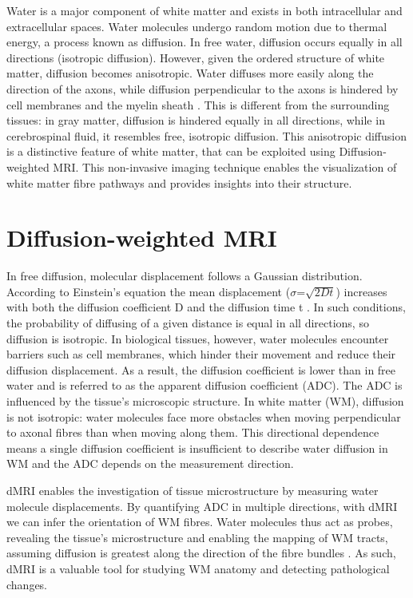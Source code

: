 Water is a major component of white matter and exists in both intracellular and extracellular spaces. Water molecules undergo random motion due to thermal energy, a process known as diffusion. In free water, diffusion occurs equally in all directions (isotropic diffusion). However, given the ordered structure of white matter, diffusion becomes anisotropic. Water diffuses more easily along the direction of the axons, while diffusion perpendicular to the axons is hindered by cell membranes and the myelin sheath \cite{Beaulieu2013}. This is different from the surrounding tissues: in gray matter, diffusion is hindered equally in all directions, while in cerebrospinal fluid, it resembles free, isotropic diffusion.
This anisotropic diffusion is a distinctive feature of white matter, that can be exploited using Diffusion-weighted MRI. This non-invasive imaging technique enables the visualization of white matter fibre pathways and provides insights into their structure.

\section{Diffusion-weighted MRI}

 In free diffusion, molecular displacement follows a Gaussian distribution. According to Einstein's equation the mean displacement ($\sigma$=$\sqrt{2Dt}$) increases with both the diffusion coefficient D and the diffusion time t \cite{Mori20143}. In such conditions, the probability of diffusing of a given distance is equal in all directions, so diffusion is isotropic.
In biological tissues, however, water molecules encounter barriers such as cell membranes, which hinder their movement and reduce their diffusion displacement. As a result, the diffusion coefficient is lower than in free water and is referred to as the apparent diffusion coefficient (ADC). The ADC is influenced by the tissue's microscopic structure. In white matter (WM), diffusion is not isotropic: water molecules face more obstacles when moving perpendicular to axonal fibres than when moving along them. This directional dependence means a single diffusion coefficient is insufficient to describe water diffusion in WM and the ADC depends on the measurement direction.

 dMRI enables the investigation of tissue microstructure by measuring water molecule displacements. By quantifying ADC in multiple directions, with dMRI we can infer the orientation of WM fibres. Water molecules thus act as probes, revealing the tissue's microstructure and enabling the mapping of WM tracts, assuming diffusion is greatest along the direction of the fibre bundles \cite{LeBihan2003}. As such, dMRI is a valuable tool for studying WM anatomy and detecting pathological changes.

